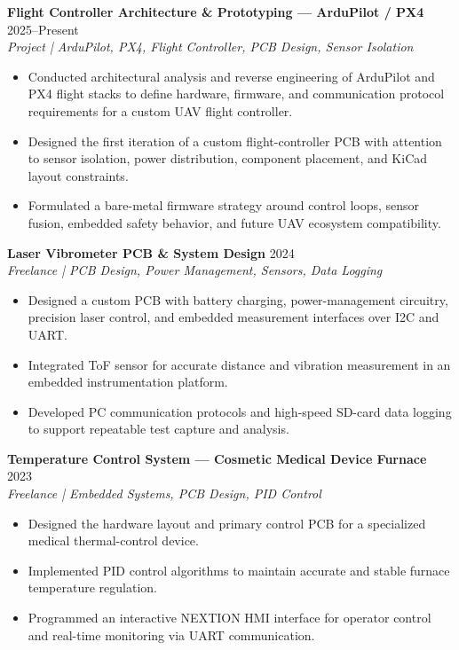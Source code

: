 \documentclass[a4paper,10pt]{article}
\begin{document}
\vspace{3pt}
\textbf{Flight Controller Architecture \& Prototyping --- ArduPilot / PX4}
\hfill 2025--Present\\
\textit{Project | ArduPilot, PX4, Flight Controller, PCB Design, Sensor Isolation}
\begin{itemize}
  \item Conducted architectural analysis and reverse engineering of ArduPilot and PX4
        flight stacks to define hardware, firmware, and communication protocol requirements
        for a custom UAV flight controller.
  \item Designed the first iteration of a custom flight-controller PCB with attention to
        sensor isolation, power distribution, component placement, and KiCad layout
        constraints.
  \item Formulated a bare-metal firmware strategy around control loops, sensor fusion,
        embedded safety behavior, and future UAV ecosystem compatibility.
\end{itemize}

\vspace{3pt}
\textbf{Laser Vibrometer PCB \& System Design} \hfill 2024\\
\textit{Freelance | PCB Design, Power Management, Sensors, Data Logging}
\begin{itemize}
  \item Designed a custom PCB with battery charging, power-management circuitry, precision
        laser control, and embedded measurement interfaces over I2C and UART.
  \item Integrated ToF sensor for accurate distance and vibration measurement in an
        embedded instrumentation platform.
  \item Developed PC communication protocols and high-speed SD-card data logging to
        support repeatable test capture and analysis.
\end{itemize}

\vspace{3pt}
\textbf{Temperature Control System --- Cosmetic Medical Device Furnace} \hfill 2023\\
\textit{Freelance | Embedded Systems, PCB Design, PID Control}
\begin{itemize}
  \item Designed the hardware layout and primary control PCB for a specialized medical
        thermal-control device.
  \item Implemented PID control algorithms to maintain accurate and stable furnace
        temperature regulation.
  \item Programmed an interactive NEXTION HMI interface for operator control and
        real-time monitoring via UART communication.
\end{itemize}
\end{document}
